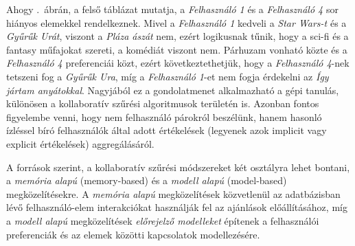 \documentclass[
]{thesis-ekf}
\theoremstyle{definition}
\theoremstyle{remark}
\begin{document}
Ahogy .~ábrán, a felső táblázat mutatja, a \emph{Felhasználó 1} és a \emph{Felhasználó 4} sor hiányos elemekkel rendelkeznek. Mivel a \emph{Felhasználó 1} kedveli a \emph{Star Wars-t} és a \emph{Gyűrűk Urát}, viszont a \emph{Pláza ászát} nem, ezért logikusnak tűnik, hogy a sci-fi és a fantasy műfajokat szereti, a komédiát viszont nem. Párhuzam vonható közte és a \emph{Felhasználó 4} preferenciái közt, ezért következtethetjük, hogy a \emph{Felhasználó 4}-nek tetszeni fog a \emph{Gyűrűk Ura}, míg a \emph{Felhasználó 1}-et nem fogja érdekelni az \emph{Így jártam anyátokkal}. Nagyjából ez a gondolatmenet alkalmazható a gépi tanulás, különösen a kollaboratív szűrési algoritmusok területén is. Azonban fontos figyelembe venni, hogy nem felhasználó párokról beszélünk, hanem hasonló ízléssel bíró felhasználók által adott értékelések (legyenek azok implicit vagy explicit értékelések) aggregálásáról.

A \cite{wiki-recommender-system,werner-ajanlo-rendszer,wiki-collaborative-filtering} források szerint, a kollaboratív szűrési módszereket két osztályra lehet bontani, a \emph{memória alapú} (memory-based) és a \emph{modell alapú} (model-based) megközelítésekre. A \emph{memória alapú} megközelítések közvetlenül az adatbázisban lévő felhasználó-elem interakciókat használják fel az ajánlások előállításához, míg a \emph{modell alapú} megközelítések \emph{előrejelző modelleket} építenek a felhasználói preferenciák és az elemek közötti kapcsolatok modellezésére.
\end{document}
